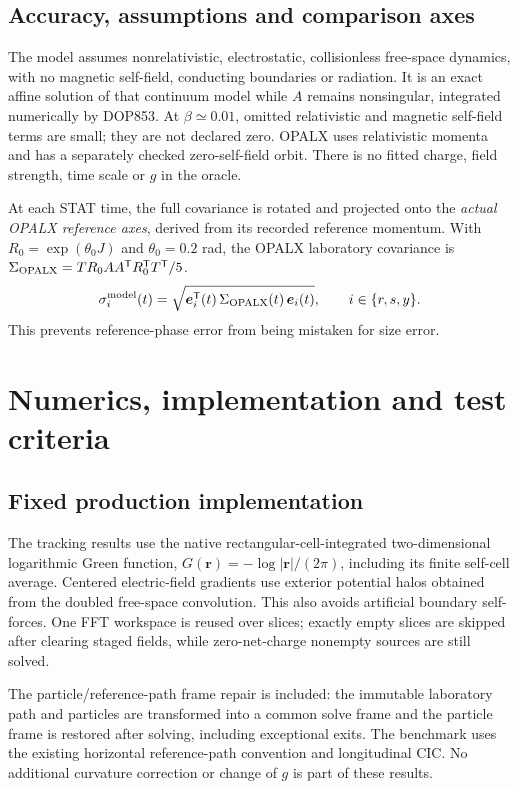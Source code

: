 \documentclass[10pt,a4paper]{article}
\newcommand{\T}{\mathsf T}
\newcommand{\tabfile}[1]{\begin{center}\small\end{center}}
\begin{document}
\subsection{Accuracy, assumptions and comparison axes}
The model assumes nonrelativistic, electrostatic, collisionless free-space
dynamics, with no magnetic self-field, conducting boundaries or radiation.
It is an exact affine solution of that continuum model while $A$ remains
nonsingular, integrated numerically by DOP853. At $\beta\simeq0.01$, omitted
relativistic and magnetic self-field terms are small; they are not declared
zero. OPALX uses relativistic momenta and has a separately checked zero-self-field
orbit. There is no fitted charge, field strength, time scale or $g$ in the oracle.

At each STAT time, the full covariance is rotated and projected onto the
\emph{actual OPALX reference axes}, derived from its recorded reference momentum.
With $R_0=\exp(\theta_0J)$ and $\theta_0=0.2$ rad, the OPALX laboratory
covariance is $\Sigma_{\rm OPALX}=T R_0AA^\T R_0^\T T^\T/5$.
\begin{equation}
 \sigma_i^{\rm model}(t)=\sqrt{\bm e_i^\T(t)\,\Sigma_{\rm OPALX}(t)\,\bm e_i(t)},
 \qquad i\in\{r,s,y\} .\label{eq:projection}
\end{equation}
This prevents reference-phase error from being mistaken for size error.
\tabfile{modelchecks}

\clearpage
\section{Numerics, implementation and test criteria}
\subsection{Fixed production implementation}
The tracking results use the native rectangular-cell-integrated two-dimensional
logarithmic Green function, $G(\bm r)=-\log|\bm r|/(2\pi)$, including its finite
self-cell average. Centered electric-field gradients use exterior potential
halos obtained from the doubled free-space convolution. This also avoids
artificial boundary self-forces. One FFT workspace is reused over slices;
exactly empty slices are skipped after clearing staged fields, while
zero-net-charge nonempty sources are still solved.

The particle/reference-path frame repair is included: the immutable laboratory
path and particles are transformed into a common solve frame and the particle
frame is restored after solving, including exceptional exits. The benchmark
uses the existing horizontal reference-path convention and longitudinal CIC.
No additional curvature correction or change of $g$ is part of these results.
\end{document}
